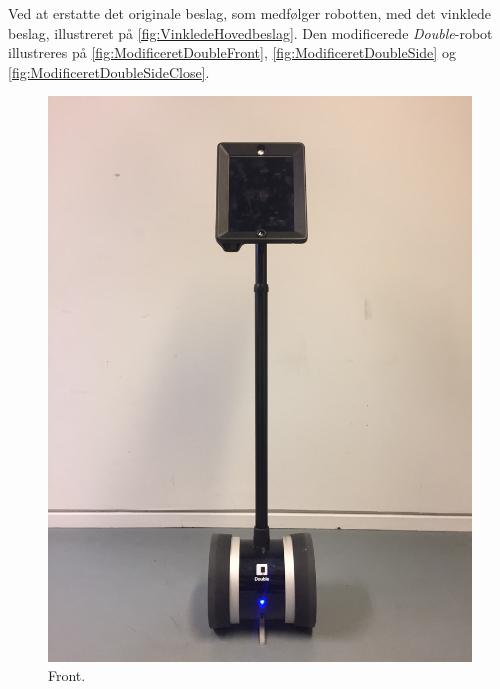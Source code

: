 \noindent
%
Ved at erstatte det originale beslag, som medfølger robotten, med det vinklede beslag, illustreret på \autoref{fig:VinkledeHovedbeslag}. Den modificerede \textit{Double}-robot illustreres på \autoref{fig:ModificeretDoubleFront}, \autoref{fig:ModificeretDoubleSide} og \autoref{fig:ModificeretDoubleSideClose}.
%
\begin{figure}[H]
\centering
\begin{minipage}{.33\textwidth}
  \centering
  \includegraphics[width=\linewidth, angle =-90]{Figure/ModificeretDoubleFront}
  \caption{Front.}
  \label{fig:ModificeretDoubleFront}
\end{minipage}%
\begin{minipage}{.33\textwidth}
  \centering

\end{minipage}
\end{figure}
